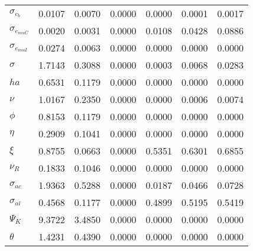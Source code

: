 \begin{center}
\begin{longtable}{lcccccc}
$ \sigma_{{e_b}}       $	 & 	          0.0107	 & 	          0.0070	 & 	          0.0000	 & 	          0.0000	 & 	          0.0001	 & 	          0.0017 \\ 
$ \sigma_{{e_{muC}}}   $	 & 	          0.0020	 & 	          0.0031	 & 	          0.0000	 & 	          0.0108	 & 	          0.0428	 & 	          0.0886 \\ 
$ \sigma_{{e_{muI}}}   $	 & 	          0.0274	 & 	          0.0063	 & 	          0.0000	 & 	          0.0000	 & 	          0.0000	 & 	          0.0000 \\ 
$ {\sigma}             $	 & 	          1.7143	 & 	          0.3088	 & 	          0.0000	 & 	          0.0003	 & 	          0.0068	 & 	          0.0283 \\ 
$ {ha}                 $	 & 	          0.6531	 & 	          0.1179	 & 	          0.0000	 & 	          0.0000	 & 	          0.0000	 & 	          0.0000 \\ 
$ \nu                  $	 & 	          1.0167	 & 	          0.2350	 & 	          0.0000	 & 	          0.0000	 & 	          0.0006	 & 	          0.0074 \\ 
$ {\phi}               $	 & 	          0.8153	 & 	          0.1179	 & 	          0.0000	 & 	          0.0000	 & 	          0.0000	 & 	          0.0000 \\ 
$ {\eta}               $	 & 	          0.2909	 & 	          0.1041	 & 	          0.0000	 & 	          0.0000	 & 	          0.0000	 & 	          0.0000 \\ 
$ \xi                  $	 & 	          0.8755	 & 	          0.0663	 & 	          0.0000	 & 	          0.5351	 & 	          0.6301	 & 	          0.6855 \\ 
$ {\nu_R}              $	 & 	          0.1833	 & 	          0.1046	 & 	          0.0000	 & 	          0.0000	 & 	          0.0000	 & 	          0.0000 \\ 
$ {\sigma_{ac}}        $	 & 	          1.9363	 & 	          0.5288	 & 	          0.0000	 & 	          0.0187	 & 	          0.0466	 & 	          0.0728 \\ 
$ {\sigma_{ai}}        $	 & 	          0.4568	 & 	          0.1177	 & 	          0.0000	 & 	          0.4899	 & 	          0.5195	 & 	          0.5419 \\ 
$ {\Psi_{K}}           $	 & 	          9.3722	 & 	          3.4850	 & 	          0.0000	 & 	          0.0000	 & 	          0.0000	 & 	          0.0000 \\ 
$ {\theta}             $	 & 	          1.4231	 & 	          0.4390	 & 	          0.0000	 & 	          0.0000	 & 	          0.0000	 & 	          0.0000 \\ 

\end{longtable}
\end{center}
